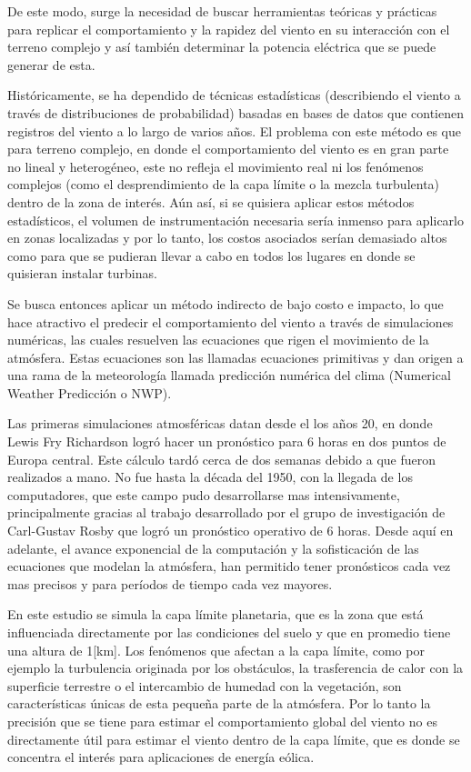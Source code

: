 De este modo, surge la necesidad de buscar herramientas teóricas y prácticas para replicar el comportamiento y la rapidez del viento en su interacción con el terreno complejo y así también determinar la potencia eléctrica que se puede generar de esta.

Históricamente, se ha dependido de técnicas estadísticas (describiendo el viento a través de distribuciones de probabilidad) basadas en bases de datos que contienen registros del viento a lo largo de varios años. El problema con este método es que para terreno complejo, en donde el comportamiento del viento es en gran parte no lineal y heterogéneo, este no refleja el movimiento real ni los fenómenos complejos (como el desprendimiento de la capa límite o la mezcla turbulenta) dentro de la zona de interés. Aún así, si se quisiera aplicar estos métodos estadísticos, el volumen de instrumentación necesaria sería inmenso para aplicarlo en zonas localizadas y por lo tanto, los costos asociados serían demasiado altos como para que se pudieran llevar a cabo en todos los lugares en donde se quisieran instalar turbinas.

Se busca entonces aplicar un método indirecto de bajo costo e impacto, lo que hace atractivo el predecir el comportamiento del viento a través de simulaciones numéricas, las cuales resuelven las ecuaciones que rigen el movimiento de la atmósfera. Estas ecuaciones son las llamadas ecuaciones primitivas y dan origen a una rama de la meteorología llamada predicción numérica del clima (Numerical Weather Predicción o NWP).

Las primeras simulaciones atmosféricas datan desde el los años 20, en donde Lewis Fry Richardson logró hacer un pronóstico para 6 horas en dos puntos de Europa central. Este cálculo tardó cerca de dos semanas debido a que fueron realizados a mano. No fue hasta la década del 1950, con la llegada de los computadores, que este campo pudo desarrollarse mas intensivamente, principalmente gracias al trabajo desarrollado por el grupo de investigación de Carl-Gustav Rosby que logró un pronóstico operativo de 6 horas. Desde aquí en adelante, el avance exponencial de la computación y la sofisticación de las ecuaciones que modelan la atmósfera, han permitido tener pronósticos cada vez mas precisos y para períodos de tiempo cada vez mayores. 

En este estudio se simula la capa límite planetaria, que es la zona que está influenciada directamente por las condiciones del suelo y que en promedio tiene una altura de 1[km]. Los fenómenos que afectan a la capa límite, como por ejemplo la turbulencia originada por los obstáculos, la trasferencia de calor con la superficie terrestre o el intercambio de humedad con la vegetación, son características únicas de esta pequeña parte de la atmósfera. Por lo tanto la precisión que se tiene para estimar el comportamiento global del viento no es directamente útil para estimar el viento dentro de la capa límite, que es donde se concentra el interés para aplicaciones de energía eólica. 

